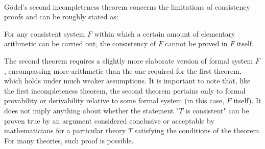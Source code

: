\documentclass[10pt,a4paper]{article}
\newcounter{theo}
\begin{document}
                            \\
                            Gödel's second incompleteness theorem concerns the limitations of consistency proofs and can be roughly stated as:
                            \begin{qt}
                                For any consistent system $F$ within which a certain amount of elementary arithmetic can be carried out, the consistency of $F$ cannot be proved in $F$  itself.
                            \end{qt}
                            The second theorem requires a slightly more elaborate version of formal system $F$, encompassing more arithmetic than the one required for the first theorem, which holds under much weaker assumptions. It is important to note that, like the first incompleteness theorem, the second theorem pertains only to formal provability or derivability relative to some formal system (in this case, $F$ itself). It does not imply anything about whether the statement "$T$ is consistent" can be proven true by an argument considered conclusive or acceptable by mathematicians for a particular theory $T$ satisfying the conditions of the theorem. For many theories, such proof is possible.
                            
\end{document}

